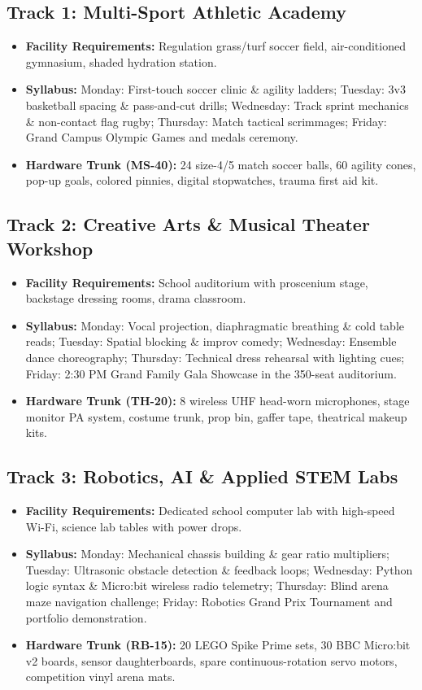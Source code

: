 \documentclass[11pt,a4paper]{article}
\begin{document}
\subsection{Track 1: Multi-Sport Athletic Academy}
\begin{itemize}
    \item \textbf{Facility Requirements:} Regulation grass/turf soccer field, air-conditioned gymnasium, shaded hydration station.
    \item \textbf{Syllabus:} Monday: First-touch soccer clinic \& agility ladders; Tuesday: 3v3 basketball spacing \& pass-and-cut drills; Wednesday: Track sprint mechanics \& non-contact flag rugby; Thursday: Match tactical scrimmages; Friday: Grand Campus Olympic Games and medals ceremony.
    \item \textbf{Hardware Trunk (MS-40):} 24 size-4/5 match soccer balls, 60 agility cones, pop-up goals, colored pinnies, digital stopwatches, trauma first aid kit.
\end{itemize}

\subsection{Track 2: Creative Arts \& Musical Theater Workshop}
\begin{itemize}
    \item \textbf{Facility Requirements:} School auditorium with proscenium stage, backstage dressing rooms, drama classroom.
    \item \textbf{Syllabus:} Monday: Vocal projection, diaphragmatic breathing \& cold table reads; Tuesday: Spatial blocking \& improv comedy; Wednesday: Ensemble dance choreography; Thursday: Technical dress rehearsal with lighting cues; Friday: 2:30 PM Grand Family Gala Showcase in the 350-seat auditorium.
    \item \textbf{Hardware Trunk (TH-20):} 8 wireless UHF head-worn microphones, stage monitor PA system, costume trunk, prop bin, gaffer tape, theatrical makeup kits.
\end{itemize}

\subsection{Track 3: Robotics, AI \& Applied STEM Labs}
\begin{itemize}
    \item \textbf{Facility Requirements:} Dedicated school computer lab with high-speed Wi-Fi, science lab tables with power drops.
    \item \textbf{Syllabus:} Monday: Mechanical chassis building \& gear ratio multipliers; Tuesday: Ultrasonic obstacle detection \& feedback loops; Wednesday: Python logic syntax \& Micro:bit wireless radio telemetry; Thursday: Blind arena maze navigation challenge; Friday: Robotics Grand Prix Tournament and portfolio demonstration.
    \item \textbf{Hardware Trunk (RB-15):} 20 LEGO Spike Prime sets, 30 BBC Micro:bit v2 boards, sensor daughterboards, spare continuous-rotation servo motors, competition vinyl arena mats.
\end{itemize}
\end{document}
